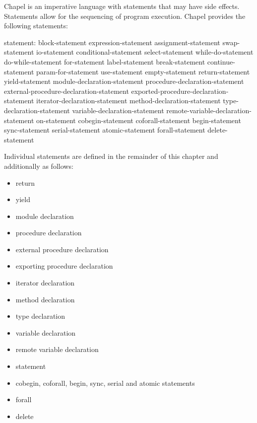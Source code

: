 \label{Statements}

Chapel is an imperative language with statements that may have side
effects.  Statements allow for the sequencing of program execution.
Chapel provides the following statements:

\begin{syntax}
statement:
  block-statement
  expression-statement
  assignment-statement
  swap-statement
  io-statement
  conditional-statement
  select-statement
  while-do-statement
  do-while-statement
  for-statement
  label-statement
  break-statement
  continue-statement
  param-for-statement
  use-statement
  empty-statement
  return-statement
  yield-statement
  module-declaration-statement
  procedure-declaration-statement
  external-procedure-declaration-statement
  exported-procedure-declaration-statement
  iterator-declaration-statement
  method-declaration-statement
  type-declaration-statement
  variable-declaration-statement
  remote-variable-declaration-statement
  on-statement
  cobegin-statement
  coforall-statement
  begin-statement
  sync-statement
  serial-statement
  atomic-statement
  forall-statement
  delete-statement
\end{syntax}

Individual statements are defined in the remainder of this chapter
and additionally as follows:

\begin{itemize}
\item return 
\item yield 
\item module declaration 
\item procedure declaration 
\item external procedure declaration 
\item exporting procedure declaration 
\item iterator declaration 
\item method declaration 
\item type declaration 
\item variable declaration 
\item remote variable declaration ~
\item {} statement 
\item cobegin, coforall, begin, sync, serial and atomic statements
\item forall 
\item delete 
\end{itemize}

